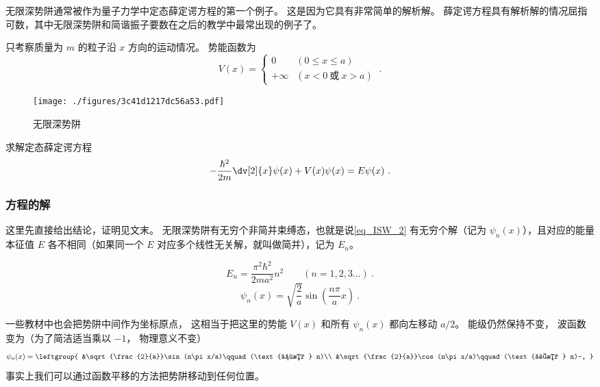 

无限深势阱通常被作为量子力学中定态薛定谔方程的第一个例子。 这是因为它具有非常简单的解析解。 薛定谔方程具有解析解的情况屈指可数，其中无限深势阱和简谐振子要数在之后的教学中最常出现的例子了。

只考察质量为 $m$ 的粒子沿 $x$ 方向的运动情况。%
势能函数为
\begin{equation}
V(x) =
\begin{cases}
0 \quad &(0 \leqslant x \leqslant a)\\
+\infty  &(x < 0 \ \text{或}\  x > a)
\end{cases}~.
\end{equation}

\begin{figure}[ht]
\centering
\texttt{[image: ./figures/3c41d1217dc56a53.pdf]}
\caption{无限深势阱} \label{fig_ISW_1}
\end{figure}

\subs
求解定态薛定谔方程
\begin{equation}\label{eq_ISW_2}
-\frac{\hbar ^2}{2m} \dv[2]{x} \psi(x) + V(x)\psi(x) = E\psi(x)~.
\end{equation} 

\subsubsection{方程的解}
这里先直接给出结论，证明见文末。 无限深势阱有无穷个非简并束缚态，也就是说\autoref{eq_ISW_2} 有无穷个解（记为 $\psi_n(x)$），且对应的能量本征值 $E$ 各不相同（如果同一个 $E$ 对应多个线性无关解，就叫做简并），记为 $E_n$。

\begin{equation}\label{eq_ISW_3}
E_n = \frac{\pi^2 \hbar^2}{2m a^2} n^2 \qquad (n = 1,2,3\dots)~.
\end{equation}
\begin{equation}\label{eq_ISW_1}
\psi_n(x) = \sqrt{\frac{2}{a}} \sin(\frac{n\pi }{a} x)~.
\end{equation}

一些教材中也会把势阱中间作为坐标原点， 这相当于把这里的势能 $V(x)$ 和所有 $\psi_n(x)$ 都向左移动 $a/2$。 能级仍然保持不变， 波函数变为（为了简洁适当乘以 $-1$， 物理意义不变）
\begin{equation}
\psi_n(x) = \leftgroup{
    &\sqrt{\frac{2}{a}}\sin(n\pi x/a)\qquad (\text{偶数 } n)\\
    &\sqrt{\frac{2}{a}}\cos(n\pi x/a)\qquad (\text{奇数 } n)~,
}\end{equation}
事实上我们可以通过函数平移的方法把势阱移动到任何位置。

